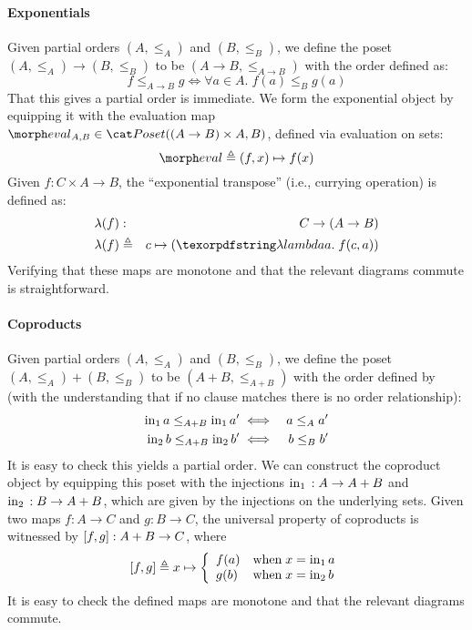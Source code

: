 \paragraph{Exponentials} Given partial orders $(A, \leq_A)$ and $(B, \leq_B)$,
we define the poset $(A , \leq_A) \to (B, \leq_B)$ to be $(A \to B, \leq_{A \to B})$
with the order defined as:
%
\begin{displaymath}
  f \leq_{A \to B} g \iff \forall a \in A.\; f(a) \leq_B g(a)
\end{displaymath}
That this gives a partial order is immediate. We form the exponential object by
equipping it with the evaluation map $\eval_{A,B} \in \Poset((A \to B) \times A, B)$,
defined via evaluation on sets:
\begin{displaymath}
  \eval \triangleq (f,x) \mapsto f(x)
\end{displaymath}
%
Given $f : C \times A \to B$, the ``exponential transpose'' (i.e., currying
operation) is defined as:
\begin{eqnarray*}
  \lambda(f) & : & C \to (A \to B) \\
  \lambda(f) & \triangleq & c \mapsto (\fnof{a} f(c,a)) 
\end{eqnarray*}
Verifying that these maps are monotone and that the relevant
diagrams commute is straightforward.

\paragraph{Coproducts} Given partial orders $(A, \leq_A)$ and $(B, \leq_B)$,
we define the poset $(A , \leq_A) + (B, \leq_B)$ to be $(A + B, \leq_{A + B})$ with
the order defined by (with the understanding that if no clause matches there is
no order relationship):
%
\begin{eqnarray*}
  \mathrm{in}_{1}\, a \leq_{A+B} \mathrm{in}_{1}\, a' & \iff & a \leq_A a' \\
  \mathrm{in}_{2}\, b \leq_{A+B} \mathrm{in}_{2}\, b' & \iff & b \leq_B b' 
\end{eqnarray*}
%
It is easy to check this yields a partial order. We can construct the coproduct
object by equipping this poset with the injections $\mathrm{in}_{1}\, {} : A \to A + B$
and $\mathrm{in}_{2}\, {} : B \to A + B$, which are given by the injections on the underlying
sets. 
%
Given two maps $f : A \to C$ and $g : B \to C$, the universal property
of coproducts is witnessed by $[{f,g}] : A + B \to C$, where
\begin{displaymath}
  [{f, g}] \triangleq x \mapsto \left\{\begin{array}{ll}
                                            f(a) & \mbox{when}\;x = \mathrm{in}_{1}\, a \\
                                            g(b) & \mbox{when}\;x = \mathrm{in}_{2}\, b
                                          \end{array}
                                        \right.
\end{displaymath}
It is easy to check the defined maps are monotone and that the relevant diagrams commute.                                      
